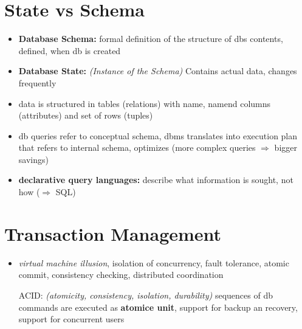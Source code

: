 \documentclass{scrartcl}
\begin{document}
\section*{State vs Schema}
\begin{itemize}
	\item \textbf{Database Schema:} formal definition of the structure of dbs contents, defined, when db is created
	\item \textbf{Database State:} \textit{(Instance of the Schema)} Contains actual data, changes frequently
	\item data is structured in tables (relations) with name, namend columns (attributes) and set of rows (tuples)
	\item db queries refer to conceptual schema, dbms translates into execution plan that refers to internal schema, optimizes (more complex queries $\Rightarrow$ bigger savings)
	\item \textbf{declarative query languages:} describe what information is sought, not how ($\Rightarrow$ \textsc{SQL})
\end{itemize}

\section*{Transaction Management}
\begin{itemize}
	\item \textit{virtual machine illusion}, isolation of concurrency, fault tolerance, atomic commit, consistency checking, distributed coordination
	\item[ACID:] \textit{(atomicity, consistency, isolation, durability)} sequences of db commands are executed as \textbf{atomice unit}, support for backup an recovery, support for concurrent users
\end{itemize}
\end{document}
